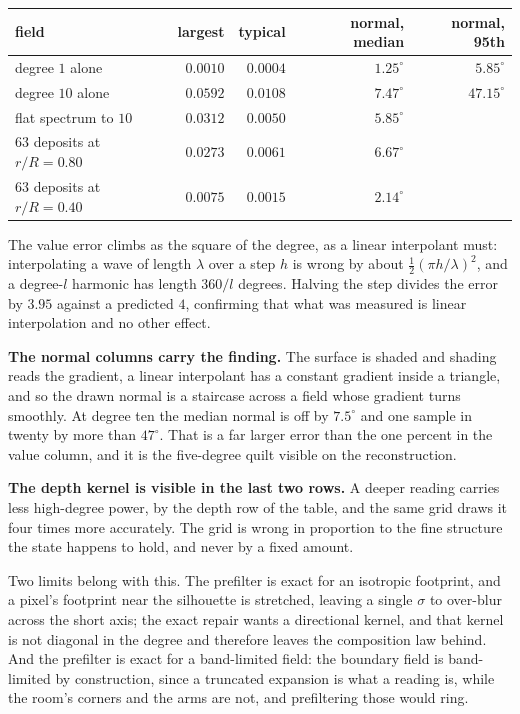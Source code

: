 \begin{center}
\begin{tabular}{lrrrr}
\toprule
field & largest & typical & normal, median & normal, 95th \\
\midrule
degree \(1\) alone & \(0.0010\) & \(0.0004\) & \(1.25^\circ\) & \(5.85^\circ\) \\
degree \(10\) alone & \(0.0592\) & \(0.0108\) & \(7.47^\circ\) & \(\mathbf{47.15^\circ}\) \\
flat spectrum to \(10\) & \(0.0312\) & \(0.0050\) & \(5.85^\circ\) & \textemdash{} \\
\(63\) deposits at \(r/R = 0.80\) & \(0.0273\) & \(0.0061\) & \(6.67^\circ\) & \textemdash{} \\
\(63\) deposits at \(r/R = 0.40\) & \(0.0075\) & \(0.0015\) & \(2.14^\circ\) & \textemdash{} \\
\bottomrule
\end{tabular}
\end{center}

The value error climbs as the square of the degree, as a linear interpolant must: interpolating a wave of length \(\lambda\) over a step \(h\) is wrong by about \(\tfrac12(\pi h/\lambda)^2\), and a degree-\(l\) harmonic has length \(360/l\) degrees. Halving the step divides the error by \(3.95\) against a predicted \(4\), confirming that what was measured is linear interpolation and no other effect.

\textbf{The normal columns carry the finding.} The surface is shaded and shading reads the gradient, a linear interpolant has a constant gradient inside a triangle, and so the drawn normal is a staircase across a field whose gradient turns smoothly. At degree ten the median normal is off by \(7.5^\circ\) and one sample in twenty by more than \(47^\circ\). That is a far larger error than the one percent in the value column, and it is the five-degree quilt visible on the reconstruction.

\textbf{The depth kernel is visible in the last two rows.} A deeper reading carries less high-degree power, by the depth row of the table, and the same grid draws it four times more accurately. The grid is wrong in proportion to the fine structure the state happens to hold, and never by a fixed amount.

Two limits belong with this. The prefilter is exact for an isotropic footprint, and a pixel's footprint near the silhouette is stretched, leaving a single \(\sigma\) to over-blur across the short axis; the exact repair wants a directional kernel, and that kernel is not diagonal in the degree and therefore leaves the composition law behind. And the prefilter is exact for a band-limited field: the boundary field is band-limited by construction, since a truncated expansion is what a reading is, while the room's corners and the arms are not, and prefiltering those would ring.

